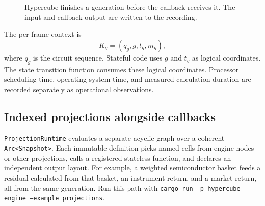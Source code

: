\documentclass{strategynet-journal}
\begin{document}
\begin{figure}[H]
\centering
{}
\caption{Hypercube finishes a generation before the callback receives it.
The input and callback output are written to the recording.}
\label{fig:circuit-path}
\end{figure}

The per-frame context is
\[
  K_g=(q_g,g,t_g,m_g),
\]
where \(q_g\) is the circuit sequence.  Stateful code uses \(g\) and \(t_g\)
as logical coordinates.  The state transition function consumes these logical
coordinates.  Processor scheduling time, operating-system time, and measured
calculation duration are recorded separately as operational observations.

\subsection{Indexed projections alongside callbacks}

\texttt{ProjectionRuntime} evaluates a separate acyclic graph over a coherent
\texttt{Arc<Snapshot>}.  Each immutable definition picks named cells from engine
nodes or other projections, calls a registered stateless function, and declares
an independent output layout.  For example, a weighted semiconductor basket
feeds a residual calculated from that basket, an instrument return, and a market
return, all from the same generation.  Run this path with
\texttt{cargo run -p hypercube-engine --example projections}.
\end{document}
